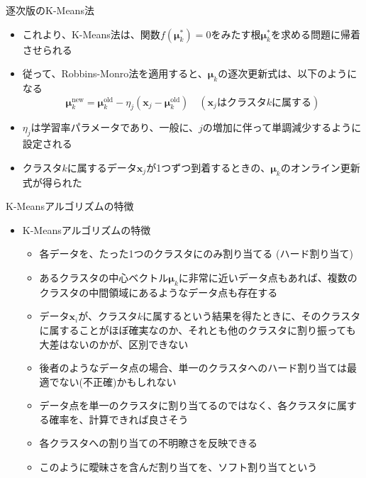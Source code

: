 \documentclass[dvipdfmx,notheorems,t]{beamer}
\begin{document}
\begin{frame}{逐次版のK-Means法}
\begin{itemize}
\begin{itemize}
		\item これより、K-Means法は、関数$f(\bm{\mu}_k^*) = 0$をみたす根$\bm{\mu}_k^*$を求める問題に帰着させられる
		\newline
		
		\item 従って、Robbins-Monro法を適用すると、$\bm{\mu}_k$の逐次更新式は、以下のようになる
		\begin{equation}
			\bm{\mu}_k^{\mathrm{new}} = \bm{\mu}_k^{\mathrm{old}} - \eta_j (\bm{x}_j - \bm{\mu}_k^{\mathrm{old}}) \quad (\bm{x}_j\text{はクラスタ$k$に属する})
		\end{equation}
		
		\item $\eta_j$は学習率パラメータであり、一般に、$j$の増加に伴って単調減少するように設定される
		\newline
		
		\item クラスタ$k$に属するデータ$\bm{x}_j$が1つずつ到着するときの、$\bm{\mu}_k$のオンライン更新式が得られた
	\end{itemize}
\end{itemize}

\end{frame}

\begin{frame}{K-Meansアルゴリズムの特徴}

\begin{itemize}
	\item K-Meansアルゴリズムの特徴
	\begin{itemize}
		\item 各データを、\alert{たった1つ}のクラスタにのみ割り当てる (\alert{ハード割り当て})
		\newline
		\item あるクラスタの中心ベクトル$\bm{\mu}_k$に非常に近いデータ点もあれば、複数のクラスタの中間領域にあるようなデータ点も存在する
		\item データ$\bm{x}_i$が、クラスタ$k$に属するという結果を得たときに、そのクラスタに属することがほぼ確実なのか、それとも他のクラスタに割り振っても大差はないのかが、区別できない
		\item 後者のようなデータ点の場合、単一のクラスタへのハード割り当ては最適でない(不正確)かもしれない
		\newline
		\item データ点を単一のクラスタに割り当てるのではなく、\alert{各クラスタに属する確率}を、計算できれば良さそう
		\item 各クラスタへの割り当ての不明瞭さを反映できる
		\item このように曖昧さを含んだ割り当てを、\alert{ソフト割り当て}という
	\end{itemize}
\end{itemize}

\end{frame}
\end{document}
